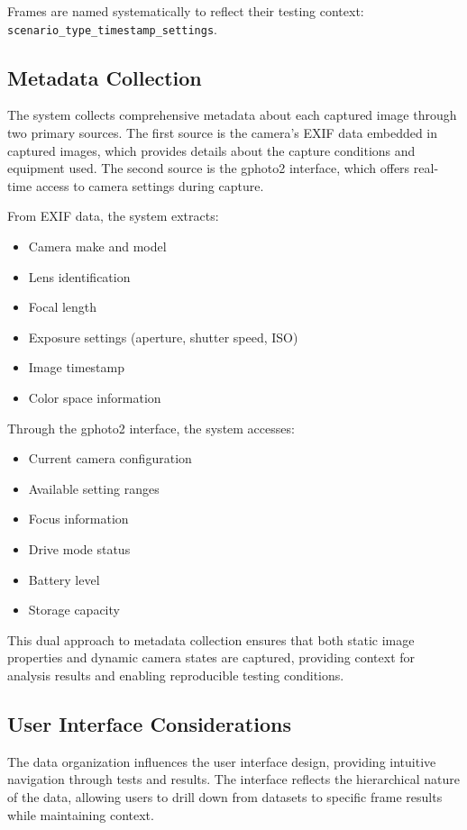 Frames are named systematically to reflect their testing context: \texttt{scenario\_type\_timestamp\_settings}.

\subsection{Metadata Collection}

The system collects comprehensive metadata about each captured image through two primary sources. The first source is the camera's EXIF data embedded in captured images, which provides details about the capture conditions and equipment used. The second source is the gphoto2 interface, which offers real-time access to camera settings during capture.

From EXIF data, the system extracts:
\begin{itemize}
    \item Camera make and model
    \item Lens identification
    \item Focal length
    \item Exposure settings (aperture, shutter speed, ISO)
    \item Image timestamp
    \item Color space information
\end{itemize}

Through the gphoto2 interface, the system accesses:
\begin{itemize}
    \item Current camera configuration
    \item Available setting ranges
    \item Focus information
    \item Drive mode status
    \item Battery level
    \item Storage capacity
\end{itemize}

This dual approach to metadata collection ensures that both static image properties and dynamic camera states are captured, providing context for analysis results and enabling reproducible testing conditions.

\subsection{User Interface Considerations}
The data organization influences the user interface design, providing intuitive navigation through tests and results. The interface reflects the hierarchical nature of the data, allowing users to drill down from datasets to specific frame results while maintaining context.

